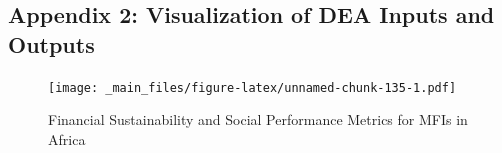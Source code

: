 \documentclass[a4paper, nobind]{templates/ociamthesis}
\begin{document}
\begin{landscape}

\hypertarget{appendix-2-visualization-of-dea-inputs-and-outputs}{%
\subsection{Appendix 2: Visualization of DEA Inputs and Outputs}\label{appendix-2-visualization-of-dea-inputs-and-outputs}}

\begin{figure}
\centering
\texttt{[image: \_main\_files/figure-latex/unnamed-chunk-135-1.pdf]}
\caption{\label{fig:unnamed-chunk-135}Financial Sustainability and Social Performance Metrics for MFIs in Africa}
\end{figure}

\end{landscape}
\end{document}
